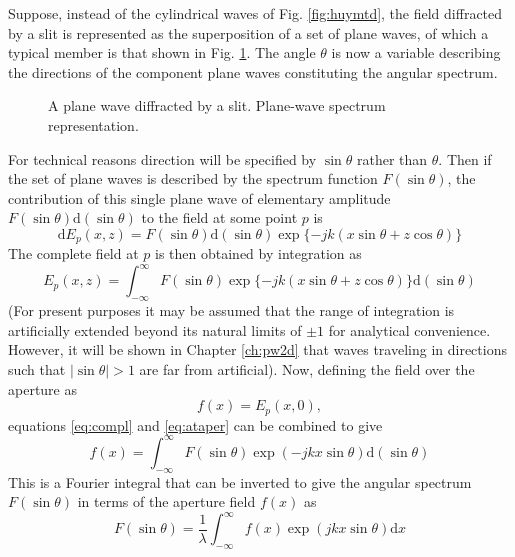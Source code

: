 Suppose, instead of the cylindrical waves of Fig. \ref{fig:huymtd}, the field diffracted by a slit is represented as the superposition of a set of plane waves, of which a typical member is that shown in Fig. \ref{fig:angspe}. The angle $\theta$ is now a variable describing the directions of the component plane waves constituting the angular spectrum.
\begin{figure}[htbp]
	\begin{center}
	\end{center}
	\caption{A plane wave diffracted by a slit. Plane-wave spectrum representation.}
	\label{fig:angspe}
\end{figure}
For technical reasons direction will be specified by $\sin \theta$ rather than $\theta$. Then if the set of plane waves is described by the spectrum function $F(\sin \theta)$, the contribution of this single plane wave of elementary amplitude $F(\sin \theta)\mathrm{d}(\sin \theta)$ to the field at some point $p$ is
\begin{equation}
\mathrm{d}E_p(x,z)=F(\sin \theta)\mathrm{d}(\sin \theta)\exp\{-jk(x\sin \theta+z\cos \theta)\}
\end{equation}
The complete field at $p$ is then obtained by integration as 
\begin{equation}
E_p(x,z)=\int_{-\infty}^{\infty}F(\sin \theta)\exp\{-jk(x\sin \theta+z\cos \theta)\}\mathrm{d}(\sin \theta)
\label{eq:compl}
\end{equation}
(For present purposes it may be assumed that the range of integration is artificially extended beyond its natural limits of $\pm1$ for analytical convenience. However, it will be shown in Chapter \ref{ch:pw2d} that waves traveling in directions such that $|\sin \theta| > 1$ are far from artificial). Now, defining the field over the aperture as
\begin{equation}
f(x)=E_p(x,0),
\label{eq:ataper}
\end{equation} 
equations \ref{eq:compl} and \ref{eq:ataper} can be combined to give
\begin{equation}
f(x)=\int_{-\infty}^{\infty}F(\sin\theta)\exp(-jkx\sin\theta)\mathrm{d}(\sin\theta)
\end{equation}
This is a Fourier integral that can be inverted to give the angular spectrum $F(\sin\theta)$ in terms of the aperture field $f(x)$ as
\begin{equation}
F(\sin\theta)=\frac{1}{\lambda}\int_{-\infty}^{\infty}f(x)\exp(jkx\sin\theta)\mathrm{d}x
\label{eq:spefun}
\end{equation}

